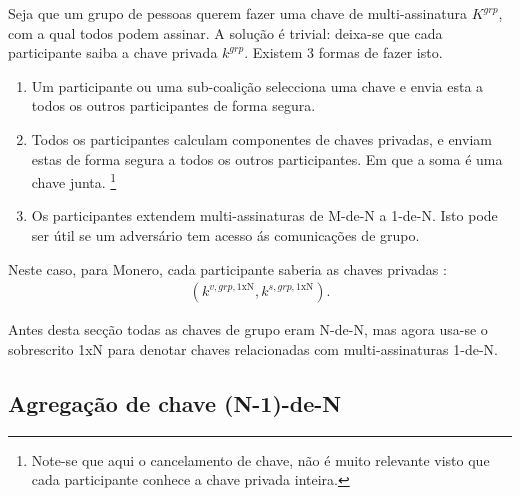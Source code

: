 Seja que um grupo de pessoas querem fazer uma chave de multi-assinatura $K^{grp}$, com a qual todos podem assinar. A solução é trivial: deixa-se que cada participante saiba a chave privada $k^{grp}$. Existem 3 formas de fazer isto.
\begin{enumerate}
    \item Um participante ou uma sub-coalição selecciona uma chave e envia esta a todos os outros participantes de forma segura.
    \item Todos os participantes calculam componentes de chaves privadas, e enviam estas de forma segura a todos os outros participantes. Em que a soma é uma chave junta. 
\footnote{Note-se que aqui o cancelamento de chave, não é muito relevante visto que cada participante conhece a chave privada inteira.}
    \item Os participantes extendem multi-assinaturas de M-de-N a 1-de-N. Isto pode ser útil se um adversário tem acesso ás comunicações de grupo. 
\end{enumerate}

Neste caso, para Monero, cada participante saberia as chaves privadas :
\begin{align*}
(k^{v,grp,{1\textrm{xN}}},k^{s,grp,{1\textrm{xN}}}) .
\end{align*}

Antes desta secção todas as chaves de grupo eram N-de-N, mas agora usa-se o sobrescrito 1xN para denotar chaves relacionadas com multi-assinaturas 1-de-N.



\subsection{Agregação de chave (N-1)-de-N}
\label{sec:n-1-of-n}

